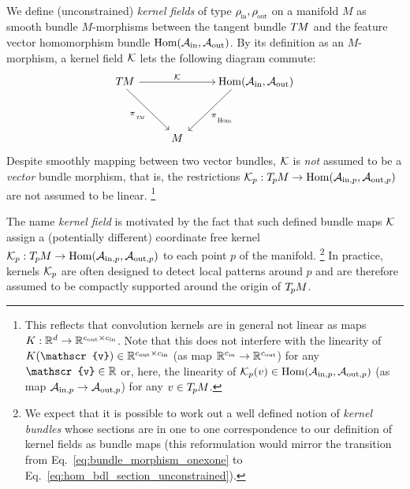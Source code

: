 \begin{dfn}
\label{dfn:kernel_field_general}
    We define (unconstrained) \emph{kernel fields} of type $\rhoin,\rhoout$ on a manifold $M$ as smooth bundle $M$-morphisms between the tangent bundle $T\mkern-1.5muM$ and the feature vector homomorphism bundle $\operatorname{Hom}(\mathcal{A}_\textup{in},\mathcal{A}_\textup{out})$.
    By its definition as an $M$-morphism, a kernel field $\mathcal{K}$ lets the following diagram commute:
    \begin{equation}\label{eq:kernel_bundle_map}
        \begin{tikzcd}[row sep=3.5em, column sep=2.5em]
            \TM  \arrow[rd, start anchor={[xshift=-1ex]}, "\piTM"']
                \arrow[rr, "\K"]
            & &
            \mkern-3mu
            \Hom(\Ain,\Aout)
                \arrow[ld, start anchor={[xshift=-3ex]}, shorten >=.1ex, shorten <=-.75ex, "\piHom"] \\
            & M &
        \end{tikzcd}
    \end{equation}
    Despite smoothly mapping between two vector bundles, $\mathcal{K}$ is \emph{not} assumed to be a \emph{vector} bundle morphism, that is, the restrictions $\mathcal{K}_p: T_{\mkern-1.5mu p}\mkern-.5muM \to \operatorname{Hom}(\mathcal{A}_{\textup{in},p}, \mathcal{A}_{\textup{out},p})$ are not assumed to be linear.%
    \footnote{
        This reflects that convolution kernels are in general not linear as maps $K:\mathbb{R}^d \to \mathbb{R}^{{c_\textup{out}}\times{c_\textup{in}}}$.
        Note that this does not interfere with the linearity of $K(\mathscr{v}) \in \R^{\cout\times\cin}$ (as map $\mathbb{R}^{{c_\textup{in}}} \to \mathbb{R}^{{c_\textup{out}}}$) for any $\mathscr{v}\in\R$ or, here, the linearity of $\mathcal{K}_p(v) \in \operatorname{Hom}(\mathcal{A}_{\textup{in},p},\mathcal{A}_{\textup{out},p})$ (as map $\mathcal{A}_{\textup{in},p} \to \mathcal{A}_{\textup{out},p}$) for any $v\in T_{\mkern-1.5mu p}\mkern-.5muM$.
    }
\end{dfn}
The name \emph{kernel field} is motivated by the fact that such defined bundle maps $\mathcal{K}$ assign a (potentially different) coordinate free kernel $\mathcal{K}_p: T_{\mkern-1.5mu p}\mkern-.5muM \to \operatorname{Hom}(\mathcal{A}_{\textup{in},p},\mathcal{A}_{\textup{out},p})$ to each point $p$ of the manifold.%
\footnote{
    We expect that it is possible to work out a well defined notion of \emph{kernel bundles} whose sections are in one to one correspondence to our definition of kernel fields as bundle maps (this reformulation would mirror the transition from Eq.~\eqref{eq:bundle_morphism_onexone} to Eq.~\eqref{eq:hom_bdl_section_unconstrained}).
}
In practice, kernels $\mathcal{K}_p$ are often designed to detect local patterns around $p$ and are therefore assumed to be compactly supported around the origin of $T_{\mkern-1.5mu p}\mkern-.5muM$.

